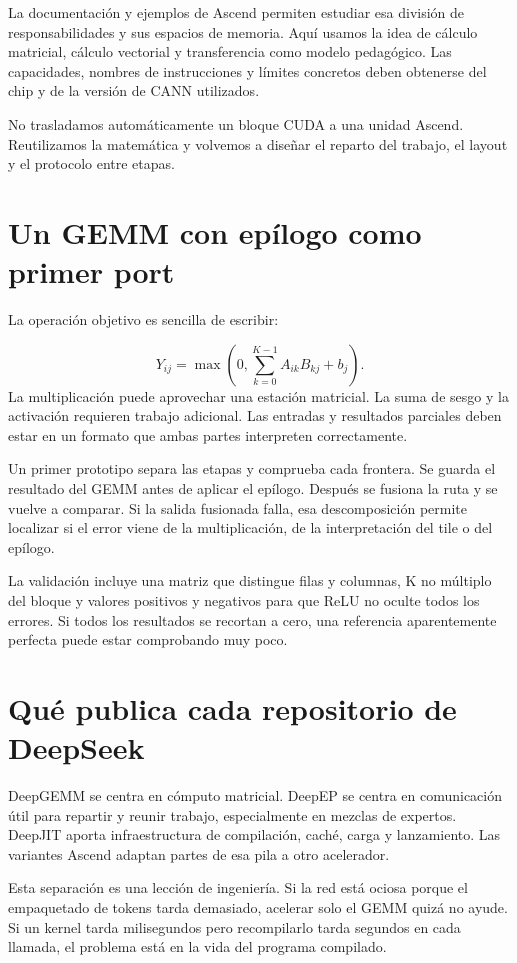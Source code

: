 \documentclass[12pt,a4paper,oneside]{report}
\begin{document}
La documentación y ejemplos de Ascend permiten estudiar esa división de responsabilidades y sus espacios de memoria. Aquí usamos la idea de cálculo matricial, cálculo vectorial y transferencia como modelo pedagógico. Las capacidades, nombres de instrucciones y límites concretos deben obtenerse del chip y de la versión de CANN utilizados. \cite{ascend-samples}

No trasladamos automáticamente un bloque CUDA a una unidad Ascend. Reutilizamos la matemática y volvemos a diseñar el reparto del trabajo, el layout y el protocolo entre etapas.

\section{Un GEMM con epílogo como primer port}
La operación objetivo es sencilla de escribir:

\[
Y_{ij}=\max\left(0,\sum_{k=0}^{K-1}A_{ik}B_{kj}+b_j\right).
\]
La multiplicación puede aprovechar una estación matricial. La suma de sesgo y la activación requieren trabajo adicional. Las entradas y resultados parciales deben estar en un formato que ambas partes interpreten correctamente.

Un primer prototipo separa las etapas y comprueba cada frontera. Se guarda el resultado del GEMM antes de aplicar el epílogo. Después se fusiona la ruta y se vuelve a comparar. Si la salida fusionada falla, esa descomposición permite localizar si el error viene de la multiplicación, de la interpretación del tile o del epílogo.

La validación incluye una matriz que distingue filas y columnas, K no múltiplo del bloque y valores positivos y negativos para que ReLU no oculte todos los errores. Si todos los resultados se recortan a cero, una referencia aparentemente perfecta puede estar comprobando muy poco.

\section{Qué publica cada repositorio de DeepSeek}
DeepGEMM se centra en cómputo matricial. DeepEP se centra en comunicación útil para repartir y reunir trabajo, especialmente en mezclas de expertos. DeepJIT aporta infraestructura de compilación, caché, carga y lanzamiento. Las variantes Ascend adaptan partes de esa pila a otro acelerador. \cite{deepgemm,deepep,deepjit,deepgemm-ascend,deepep-ascend}

Esta separación es una lección de ingeniería. Si la red está ociosa porque el empaquetado de tokens tarda demasiado, acelerar solo el GEMM quizá no ayude. Si un kernel tarda milisegundos pero recompilarlo tarda segundos en cada llamada, el problema está en la vida del programa compilado.
\end{document}

